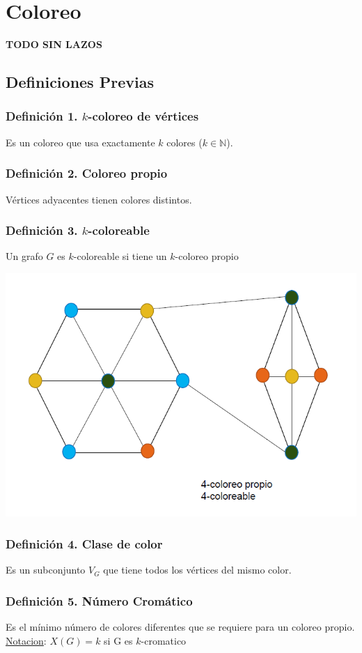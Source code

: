 \documentclass{article}
\newcommand{\naturales}{\mathbb{N}}                     %
\newcommand{\bld}[1]{\textbf{#1}}
\begin{document}
\newpage
\section{Coloreo}
\bld{TODO SIN LAZOS}
\subsection{Definiciones Previas}
\subsubsection*{Definición 1. $k$-coloreo de vértices}
Es un coloreo que usa exactamente $k$ colores ($k \in \naturales$).

\subsubsection*{Definición 2. Coloreo propio}
Vértices adyacentes tienen colores distintos.

\subsubsection*{Definición 3. $k$-coloreable}
Un grafo $G$ es $k$-coloreable si tiene un $k$-coloreo propio
\begin{center}
    \includegraphics[width=.50\textwidth]{grafoNcoloreable.PNG}
\end{center}

\subsubsection*{Definición 4. Clase de color}
Es un subconjunto $V_G$ que tiene todos los vértices del mismo color.

\subsubsection*{Definición 5. Número Cromático}
Es el mínimo número de colores diferentes que se requiere para un coloreo propio.
\\\underline{Notacion}: $X(G) = k$ si G es $k$-cromatico
\end{document}
